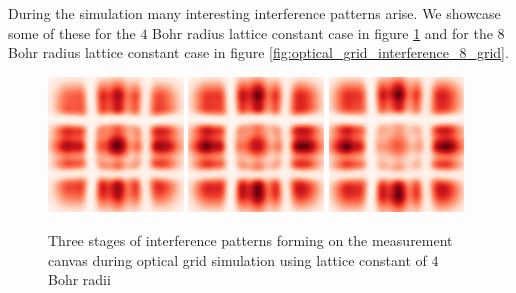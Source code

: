 During the simulation many interesting interference patterns arise.
We showcase some of these for the $4$ Bohr radius lattice constant case in figure \ref{fig:optical_grid_interference} and for the $8$ Bohr radius lattice constant case in figure \ref{fig:optical_grid_interference_8_grid}.
\begin{figure}
	\begin{center}
		\includegraphics[width=0.32\textwidth]{figures/optical_grid_interference_01.png}
		\includegraphics[width=0.32\textwidth]{figures/optical_grid_interference_02.png}
		\includegraphics[width=0.32\textwidth]{figures/optical_grid_interference_03.png}
		\caption{Three stages of interference patterns forming on the measurement canvas during optical grid simulation using lattice constant of $4$ Bohr radii}
		\label{fig:optical_grid_interference}
	\end{center}	
\end{figure}
